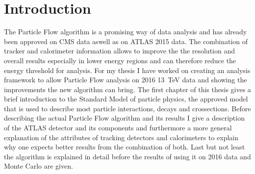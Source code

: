 \chapter{Introduction}
\label{sec:intro}




The Particle Flow algorithm is a promising way of data analysis and has already been approved on CMS data aswell as on ATLAS 2015 data. The combination of tracker  and calorimeter information allows to improve the the resolution and overall results especially in lower energy regions and can therefore reduce the energy threshold for analysis. For my thesis I have worked on creating an analysis framework to allow Particle Flow analysis on 2016 \SI{13}{\TeV} data and showing the improvements the new algorithm can bring.
The first chapter of this thesis gives a brief introduction to the Standard Model of particle physics, the approved model that is used to describe most particle interactions, decays and crossections.
Before describing the actual Particle Flow algorithm and its results I give a description of the ATLAS detector and its components and furthermore a more general explanation of the attributes of tracking detectors and calorimeters to explain why one expects better results from the combination of both.
Last but not least the algorithm is explained in detail before the results of using it on 2016 data and Monte Carlo are given.

